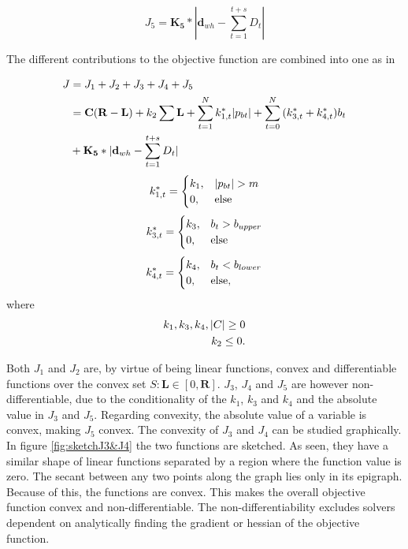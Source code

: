 \begin{equation}
    J_5 = \mathbf{K_5}*|\mathbf{d}_{wh}-\sum_{t=1}^{t+s}{D_t}|
    \label{eq:J5}
\end{equation}

The different contributions to the objective function are combined into one as in 

\begin{align}
    J &= J_1 + J_2 + J_3 + J_4 + J_5\notag\\
    &= \mathbf{C}(\mathbf{R}-\mathbf{L}) + k_2\sum\mathbf{L} + \sum_{t=1}^{N}{k_{1,t}^*|p_{bt}|} + \sum_{t=0}^{N}{(k_{3,t}^*+k_{4,t}^*)b_t }\\
    &+ \mathbf{K_5}*|\mathbf{d}_{wh}-\sum_{t=1}^{t+s}{D_t}|
    \label{eq:objective_function}
\end{align}
\begin{equation}
    k_{1,t}^* =  \begin{cases}
            k_1,& |p_{bt}|>m\\
            0, & \text{else}
            \end{cases}
            \notag
\end{equation}
\begin{equation}
    k_{3,t}^* =  \begin{cases}
            k_3,& b_{t}>b_{upper}\\
            0, & \text{else}
            \end{cases}
            \notag
\end{equation}
\begin{equation}
    k_{4,t}^* =  \begin{cases}
            k_4,& b_{t}<b_{lower}\\
            0, & \text{else},
            \end{cases}
            \notag
\end{equation}
where  
\begin{align}
    k_1,k_3,k_4,|C|\geq 0\notag\\
    k_2 \leq 0. \notag
\end{align}

Both $J_1$ and $J_2$ are, by virtue of being linear functions, convex and differentiable functions over the convex set $\mathit{S}: \mathbf{L}\in [0,\mathbf{R}]$. $J_3$, $J_4$ and $J_5$ are however non-differentiable, due to the conditionality of the $k_1$, $k_3$ and $k_4$ and the absolute value in $J_3$ and $J_5$. Regarding convexity, the absolute value of a variable is convex, making $J_5$ convex. The  convexity of $J_3$ and $J_4$ can be studied graphically. In figure \ref{fig:sketchJ3&J4} the two functions are sketched. As seen, they have a similar shape of linear functions separated by a region where the function value is zero. The secant between any two points along the graph lies only in its epigraph. Because of this, the functions are convex. This makes the overall objective function convex and non-differentiable. The non-differentiability excludes solvers dependent on analytically finding the gradient or hessian of the objective function. 

